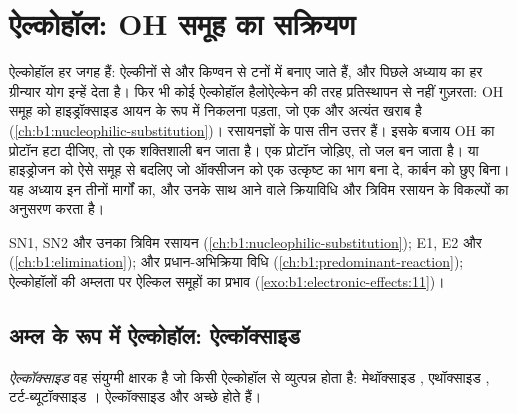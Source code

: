\chapter{ऐल्कोहॉल: OH समूह का सक्रियण}\label{ch:b1:alcohol-activation}

ऐल्कोहॉल हर जगह हैं: ऐल्कीनों से और किण्वन से टनों में बनाए जाते हैं,
और पिछले अध्याय का हर ग्रीन्यार योग इन्हें देता है। फिर भी कोई ऐल्कोहॉल
हैलोऐल्केन की तरह प्रतिस्थापन से नहीं गुज़रता: OH समूह को हाइड्रॉक्साइड आयन के रूप में
निकलना पड़ता, जो एक  और अत्यंत खराब  है (\cref{ch:b1:nucleophilic-substitution})।
रसायनज्ञों के पास तीन उत्तर हैं। इसके बजाय OH का प्रोटॉन हटा दीजिए, तो
 एक शक्तिशाली  बन जाता है। एक प्रोटॉन जोड़िए, तो  जल बन जाता है। या हाइड्रोजन को ऐसे समूह से बदलिए जो
ऑक्सीजन को एक उत्कृष्ट  का भाग बना दे, कार्बन को छुए
बिना। यह अध्याय इन तीनों मार्गों का, और उनके साथ आने वाले
क्रियाविधि और त्रिविम रसायन के विकल्पों का अनुसरण करता है।

\begin{recall}
SN1, SN2 और उनका त्रिविम रसायन (\cref{ch:b1:nucleophilic-substitution});
E1, E2 और  (\cref{ch:b1:elimination}); 
और प्रधान-अभिक्रिया विधि (\cref{ch:b1:predominant-reaction});
ऐल्कोहॉलों की अम्लता पर ऐल्किल समूहों का प्रभाव
(\cref{exo:b1:electronic-effects:11})।
\end{recall}

\section{अम्ल के रूप में ऐल्कोहॉल: ऐल्कॉक्साइड}

\begin{definition}[ऐल्कॉक्साइड]\label{def:b1:alcohol-activation:alkoxide}
\emph{ऐल्कॉक्साइड} वह संयुग्मी क्षारक  है जो किसी
ऐल्कोहॉल  से व्युत्पन्न होता है: मेथॉक्साइड , एथॉक्साइड ,
टर्ट-ब्यूटॉक्साइड । ऐल्कॉक्साइड  और अच्छे
 होते हैं।
\end{definition}

